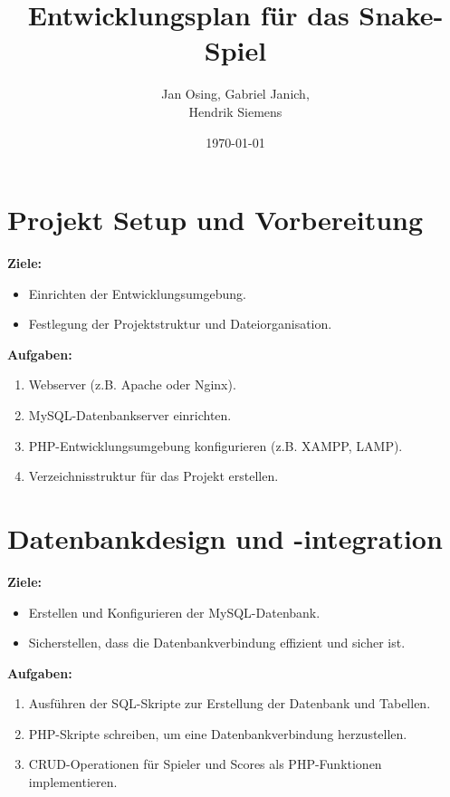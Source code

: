 \documentclass{article}
\title{Entwicklungsplan für das Snake-Spiel}
\author{Jan Osing, Gabriel Janich, \\ Hendrik Siemens}
\date{\today}
\begin{document}
	
	\maketitle
	
	\section{Projekt Setup und Vorbereitung}
	\textbf{Ziele:}
	\begin{itemize}
		\item Einrichten der Entwicklungsumgebung.
		\item Festlegung der Projektstruktur und Dateiorganisation.
	\end{itemize}
	\textbf{Aufgaben:}
	\begin{enumerate}
		\item Webserver (z.B. Apache oder Nginx).
		\item MySQL-Datenbankserver einrichten.
		\item PHP-Entwicklungsumgebung konfigurieren (z.B. XAMPP, LAMP).
		\item Verzeichnisstruktur für das Projekt erstellen.
	\end{enumerate}
	
	\section{Datenbankdesign und -integration}
	\textbf{Ziele:}
	\begin{itemize}
		\item Erstellen und Konfigurieren der MySQL-Datenbank.
		\item Sicherstellen, dass die Datenbankverbindung effizient und sicher ist.
	\end{itemize}
	\textbf{Aufgaben:}
	\begin{enumerate}
		\item Ausführen der SQL-Skripte zur Erstellung der Datenbank und Tabellen.
		\item PHP-Skripte schreiben, um eine Datenbankverbindung herzustellen.
		\item CRUD-Operationen für Spieler und Scores als PHP-Funktionen implementieren.
	\end{enumerate}
	
\end{document}
